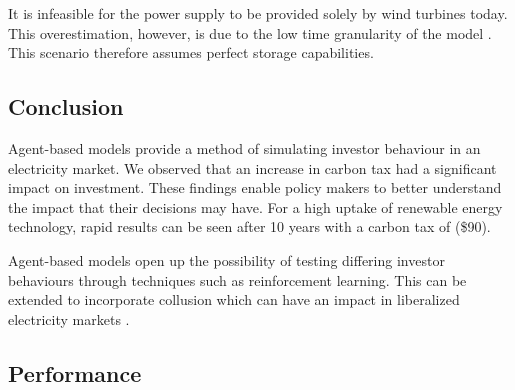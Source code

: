 It is infeasible for the power supply to be provided solely by wind turbines today. This overestimation, however, is due to the low time granularity of the model \cite{Collins2017}. This scenario therefore assumes perfect storage capabilities.




\subsection{Conclusion}


Agent-based models provide a method of simulating investor behaviour in an electricity market. We observed that an increase in carbon tax had a significant impact on investment. These findings enable policy makers to better understand the impact that their decisions may have. For a high uptake of renewable energy technology, rapid results can be seen after 10 years with a carbon tax of  (\$90).

Agent-based models open up the possibility of testing differing investor behaviours through techniques such as reinforcement learning. This can be extended to incorporate collusion which can have an impact in liberalized electricity markets \cite{Benjamin2016}.



\subsection{Performance}



